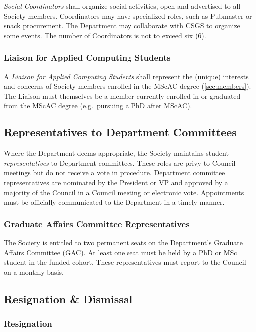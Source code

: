 \textit{Social Coordinators} shall organize social activities, open and advertised to all Society members. Coordinators may have specialized roles, such as Pubmaster or snack procurement. The Department may collaborate with CSGS to organize some events. The number of Coordinators is not to exceed six ($6$).

\subsubsection{Liaison for Applied Computing Students}

A \textit{Liaison for Applied Computing Students} shall represent the (unique)
interests and concerns of Society members enrolled in the MScAC degree
(\ref{sec:members}). The Liaison must themselves be a member currently enrolled
in or graduated from the MScAC degree (e.g.\ pursuing a PhD after MScAC).

\subsection{Representatives to Department Committees}\label{sec:representatives}

Where the Department deems appropriate, the Society maintains student
\textit{representatives} to Department committees. These roles are privy to
Council meetings but do not receive a vote in procedure. Department committee
representatives are nominated by the President or VP and approved by a majority
of the Council in a Council meeting or electronic vote. Appointments must be
officially communicated to the Department in a timely manner.

\subsubsection{Graduate Affairs Committee Representatives}

The Society is entitled to two permanent seats on the Department's Graduate
Affairs Committee (GAC). At least one seat must be held by a PhD or MSc student
in the funded cohort. These representatives must report to the Council on a
monthly basis.

\subsection{Resignation \& Dismissal}

\subsubsection{Resignation}

